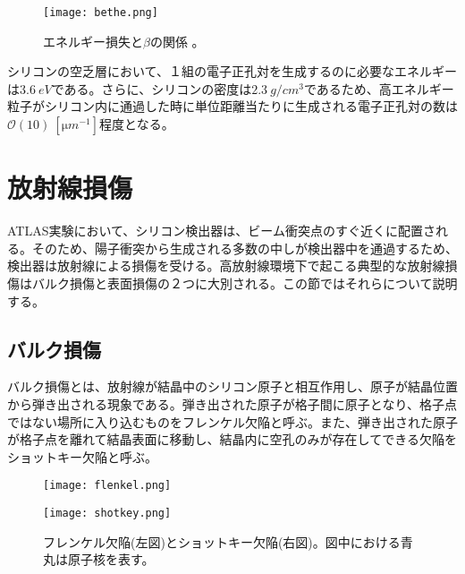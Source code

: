 \begin{figure}[tbp]
  \centering
  \texttt{[image: bethe.png]}
  \caption[エネルギー損失と$\beta$の関係。]{エネルギー損失と$\beta$の関係 \cite{bethe}。}
  \label{fig:bethe}
\end{figure}

シリコンの空乏層において、１組の電子正孔対を生成するのに必要なエネルギーは$3.6\ \si{eV}$である。さらに、シリコンの密度は$2.3\ \si{g/cm^3}$であるため、高エネルギー粒子がシリコン内に通過した時に単位距離当たりに生成される電子正孔対の数は$\mathcal{O}(10) \ [\si{\micro m^{-1}}]$程度となる。

\section{放射線損傷}
\label{sec:houshasennsonnshou}
ATLAS実験において、シリコン検出器は、ビーム衝突点のすぐ近くに配置される。そのため、陽子衝突から生成される多数の中しが検出器中を通過するため、検出器は放射線による損傷を受ける。高放射線環境下で起こる典型的な放射線損傷はバルク損傷と表面損傷の２つに大別される。この節ではそれらについて説明する。


\subsection{バルク損傷}
\label{sec:baruku}
バルク損傷とは、放射線が結晶中のシリコン原子と相互作用し、原子が結晶位置から弾き出される現象である。弾き出された原子が格子間に原子となり、格子点ではない場所に入り込むものをフレンケル欠陥と呼ぶ。また、弾き出された原子が格子点を離れて結晶表面に移動し、結晶内に空孔のみが存在してできる欠陥をショットキー欠陥と呼ぶ。
\begin{figure}[tbp]
  \begin{minipage}[b]{0.45\linewidth}
    \centering
    \texttt{[image: flenkel.png]}
  \end{minipage}
  \begin{minipage}[b]{0.45\linewidth}
    \centering
    \texttt{[image: shotkey.png]}
  \end{minipage}
  \caption[フレンケル欠陥とショットキー欠陥]{フレンケル欠陥(左図)とショットキー欠陥(右図)。図中における青丸は原子核を表す。}
  \label{fig:kekkan}
\end{figure}


